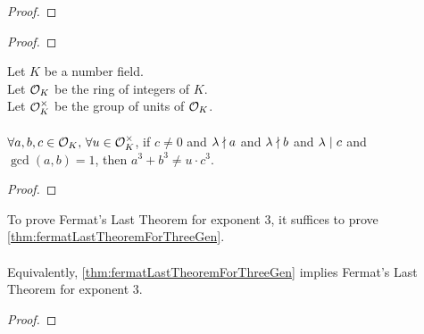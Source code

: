 \begin{lemma}
    \label{lmm:Solution1_final_multiplicity_lt}
    \leanok
\end{lemma}
\begin{proof}
    \leanok
\end{proof}

\begin{theorem}
    \label{lmm:exists_Solution_multiplicity_lt}
    \leanok
\end{theorem}
\begin{proof}
    \leanok
\end{proof}

\begin{theorem}
    \label{thm:fermatLastTheoremForThreeGen}
    \leanok
    Let $K$ be a number field. \\
    Let $\mathcal{O}_K$ be the ring of integers of $K$. \\
    Let $\mathcal{O}^\times_K$ be the group of units of $\mathcal{O}_K$. \\ \\
    $\forall a, b, c \in \mathcal{O}_K,\, \forall u \in \mathcal{O}^\times_K$, if $c \neq 0$
    and $\lambda \nmid a$ and $\lambda \nmid b$ and
    $\lambda \mid c$ and $\gcd(a,b)=1$, then $a^3 + b^3 \neq u \cdot c^3$.
\end{theorem}
\begin{proof}
    \leanok
\end{proof}

\begin{lemma}
    \label{lmm:FermatLastTheoremForThree_of_FermatLastTheoremThreeGen}
    \leanok
    To prove Fermat's Last Theorem for exponent $3$,
    it suffices to prove \ref{thm:fermatLastTheoremForThreeGen}. \\\\
    Equivalently, \ref{thm:fermatLastTheoremForThreeGen} implies
    Fermat's Last Theorem for exponent $3$.
\end{lemma}
\begin{proof}
    \leanok
\end{proof}